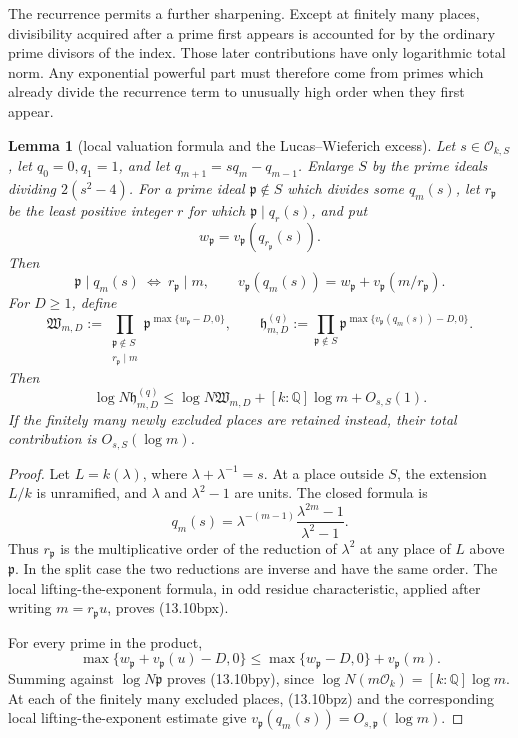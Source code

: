 \documentclass[11pt,reqno]{amsart}
\newtheorem{lemma}[theorem]{Lemma}
\theoremstyle{definition}
\theoremstyle{remark}
\newcommand{\Q}{\mathbb Q}
\newcommand{\cO}{\mathcal O}
\begin{document}
The recurrence permits a further sharpening.  Except at finitely many
places, divisibility acquired after a prime first appears is accounted for
by the ordinary prime divisors of the index.  Those later contributions have
only logarithmic total norm.  Any exponential powerful part must therefore
come from primes which already divide the recurrence term to unusually high
order when they first appear.

\begin{lemma}[local valuation formula and the Lucas--Wieferich excess]
\label{lem:lucas-wieferich-excess}
Let \(s\in\cO_{k,S}\), let \(q_0=0,q_1=1\), and let
\(q_{m+1}=sq_m-q_{m-1}\).  Enlarge \(S\) by the prime ideals dividing
\(2(s^2-4)\).  For a prime ideal \(\mathfrak p\notin S\) which divides
some \(q_m(s)\), let \(r_{\mathfrak p}\) be the least positive integer
\(r\) for which \(\mathfrak p\mid q_r(s)\), and put
\[
 w_{\mathfrak p}=v_{\mathfrak p}(q_{r_{\mathfrak p}}(s)).
\]
Then
\[
 \mathfrak p\mid q_m(s)\ \Longleftrightarrow\
 r_{\mathfrak p}\mid m,\qquad
 v_{\mathfrak p}(q_m(s))
 =w_{\mathfrak p}+v_{\mathfrak p}(m/r_{\mathfrak p}).
\tag{13.10bpx}
\]
For \(D\ge1\), define
\[
 \mathfrak W_{m,D}:=
 \prod_{\substack{\mathfrak p\notin S\\r_{\mathfrak p}\mid m}}
 \mathfrak p^{\max\{w_{\mathfrak p}-D,0\}},
 \qquad
 \mathfrak h^{(q)}_{m,D}:=
 \prod_{\mathfrak p\notin S}
 \mathfrak p^{\max\{v_{\mathfrak p}(q_m(s))-D,0\}}.
\]
Then
\[
 \log N\mathfrak h^{(q)}_{m,D}
 \le \log N\mathfrak W_{m,D}
      +[k:\Q]\log m+O_{s,S}(1).
\tag{13.10bpy}
\]
If the finitely many newly excluded places are retained instead, their
total contribution is \(O_{s,S}(\log m)\).
\end{lemma}

\begin{proof}
Let \(L=k(\lambda)\), where
\(\lambda+\lambda^{-1}=s\).  At a place outside \(S\), the extension
\(L/k\) is unramified, and \(\lambda\) and \(\lambda^2-1\) are units.
The closed formula is
\[
 q_m(s)=\lambda^{-(m-1)}
         \frac{\lambda^{2m}-1}{\lambda^2-1}.
\tag{13.10bpz}
\]
Thus \(r_{\mathfrak p}\) is the multiplicative order of the reduction of
\(\lambda^2\) at any place of \(L\) above \(\mathfrak p\).  In the split
case the two reductions are inverse and have the same order.  The local
lifting-the-exponent formula, in odd residue characteristic, applied after
writing \(m=r_{\mathfrak p}u\), proves (13.10bpx).

For every prime in the product,
\[
 \max\{w_{\mathfrak p}+v_{\mathfrak p}(u)-D,0\}
 \le \max\{w_{\mathfrak p}-D,0\}+v_{\mathfrak p}(m).
\]
Summing against \(\log N\mathfrak p\) proves (13.10bpy), since
\(\log N(m\cO_k)=[k:\Q]\log m\).  At each of the finitely many excluded
places, (13.10bpz) and the corresponding local
lifting-the-exponent estimate give
\(v_{\mathfrak p}(q_m(s))=O_{s,\mathfrak p}(\log m)\).
\end{proof}
\end{document}
